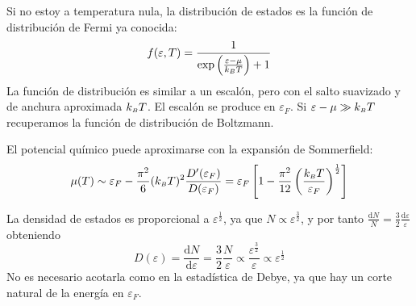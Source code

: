 Si no estoy a temperatura nula, la distribución de estados es la
función de distribución de Fermi ya conocida:
\begin{equation}
  f(\varepsilon,T) = \frac{1}{\exp \left(\frac{\varepsilon-\mu}{k_{\scriptscriptstyle{B}}  T}\right)+1}
\end{equation}
La función de distribución es similar a un escalón, pero con el salto
suavizado y de anchura aproximada $k_{\scriptscriptstyle{B}}  T$. El escalón se produce en
$\varepsilon_F$. Si $\varepsilon-\mu
\gg k_{\scriptscriptstyle{B}}  T$ recuperamos la función de distribución de Boltzmann.

El potencial químico puede aproximarse con la expansión de
Sommerfield:
\begin{equation}
  \label{eq:somm}
  \mu(T) \sim \varepsilon_F - \frac{\pi^2}{6} (k_{\scriptscriptstyle{B}}  T)^2
  \frac{D'(\varepsilon_F)}{D(\varepsilon_F)} = \varepsilon_F \left[ 1-
    \frac{\pi^2}{12} \left( \frac{k_{\scriptscriptstyle{B}}  T}{\varepsilon_F} \right) ^{\frac{1}{2}}\right]
\end{equation}

La densidad de estados es proporcional a $\varepsilon^\frac{1}{2}$, ya
que $N \propto \varepsilon^{\frac{3}{2}}$, y por tanto
$\frac{\text{d}N}{N} = \frac{3}{2}
\frac{\text{d}\varepsilon}{\varepsilon}$ obteniendo
\begin{equation}
  D(\varepsilon) = \frac{\text{d}N}{\text{d}\varepsilon} =
  \frac{3}{2}\frac{N}{\varepsilon} \propto \frac{\varepsilon^{\frac{3}{2}}}{\varepsilon} \propto \varepsilon ^ \frac{1}{2}
\end{equation}
No es necesario acotarla como en la estadística de Debye, ya que hay
un corte natural de la energía en $\varepsilon_F$.

